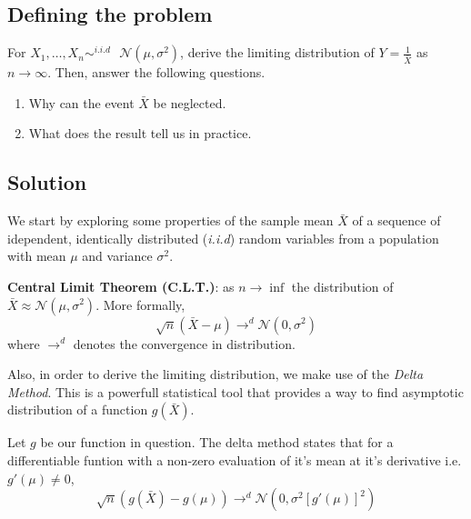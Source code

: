 \subsection{Defining the problem}
For $X_1, \ldots, X_n \sim^{i.i.d} \text{ } \mathcal{N}(\mu, \sigma^2)$, derive the limiting distribution of  $Y = \frac{1}{\bar{X}}$ as $n \rightarrow \infty$. Then, answer the following questions.
\begin{enumerate}
    \item Why can the event $\bar{X}$ be neglected.
    \item What does the result tell us in practice.
\end{enumerate}

\vspace{0.2cm}

\subsection{Solution}

\vspace{0.2cm}

We start by exploring some properties of the sample mean $\bar{X}$ of a sequence of idependent, identically distributed (\textit{i.i.d}) random variables from a population with mean $\mu$ and variance
$\sigma^2$.

\vspace{0.2cm}

\begin{theorem}
    \textbf{Central Limit Theorem (C.L.T.)}: as $n \rightarrow \inf$ the distribution of $\bar{X} \approx \mathcal{N}(\mu, \sigma^2)$. More formally, 
    $$\sqrt{n}\left(\bar{X} - \mu\right) \rightarrow^d \mathcal{N}(0, \sigma^2)$$ where $\rightarrow^d$ denotes the convergence in distribution.
\end{theorem}

\vspace{0.2cm}

Also, in order to derive the limiting distribution, we make use of the \textit{Delta Method}. This is a powerfull statistical tool that provides a way to find asymptotic
distribution of a function $g(\bar{X})$.

\begin{definition}
    Let $g$ be our function in question. The delta method states that for a differentiable funtion with a non-zero evaluation of it's mean at it's derivative i.e. $g\prime(\mu) \neq 0$,
    $$\sqrt{n}\left(g(\bar{X}) - g(\mu)\right) \rightarrow^d \mathcal{N}(0, \sigma^2 \left[g \prime (\mu)\right]^2)$$
\end{definition}


